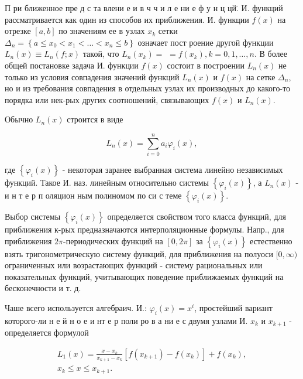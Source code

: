 \documentclass[10pt]{article}
\begin{document}
П ри ближенное пре д с та влени е и в ч ч и л е ни е ф у н ц цй̈. И. функций рассматривается как один из способов их приближения. И. функции $f(x)$ на отрезке $[a, b]$ по значениям ее в узлах $x_{k}$ сетки $\Delta_{n}=\left\{a \leqslant x_{0}<x_{1}<\ldots<x_{n} \leqslant b\right\}$ означает пост роение другой функции $L_{n}(x) \equiv L_{n}(f ; x)$ такой, что $L_{n}\left(x_{k}\right)=$ $=f\left(x_{k}\right), k=0,1, \ldots, n$. В более общей постановке задача И. функции $f(x)$ состоит в построении $L_{n}(x)$ не только из условия совпадения значений функций $L_{n}(x)$ и $f(x)$ на сетке $\Delta_{n}$, но и из требования совпадения в отдельных узлах их производных до какого-то порядка или нек-рых других соотношений, связывающих $f(x)$ и $L_{n}(x)$.



Обычно $L_{n}(x)$ строится в виде



\[

L_{n}(x)=\sum_{i=0}^{n} a_{i} \varphi_{i}(x),

\]



где $\left\{\varphi_{i}(x)\right\}$ - некоторая заранее выбранная система линейно независимых функций. Такое И. наз. линейным относительно системы $\left\{\varphi_{i}(x)\right\}$, а $L_{n}(x)$ - и н т е р п оляцион ным полиномом по си с теме $\left\{\varphi_{i}(x)\right\}$.



Выбор системы $\left\{\varphi_{i}(x)\right\}$ определяется свойством того класса функций, для приближения к-рых предназначаются интерполяционные формулы. Напр., для приближения $2 \pi$-периодических функций на $[0,2 \pi]$ за $\left\{\varphi_{i}(x)\right\}$ естественно взять тригонометрическую систему функций, для приближения на полуоси $[0, \infty)$ ограниченных или возрастающих функций - систему рациональных или показательных функций, учитывающих поведение приближаемых функций на бесконечности и т. д.



Чаше всего используется алгебраич. И.: $\varphi_{i}(x)=x^{i}$, простейший вариант которого-ли н е й н о е и нт е р поли ро в а ни е с двумя узлами И. $x_{k}$ и $x_{k+1}$ - определяется формулой



\[

\begin{gathered}

L_{1}(x)=\frac{x-x_{k}}{x_{k+1}-x_{k}}\left[f\left(x_{k+1}\right)-f\left(x_{k}\right)\right]+f\left(x_{k}\right), \\

x_{k} \leqslant x \leqslant x_{k+1} .

\end{gathered}

\]
\end{document}
